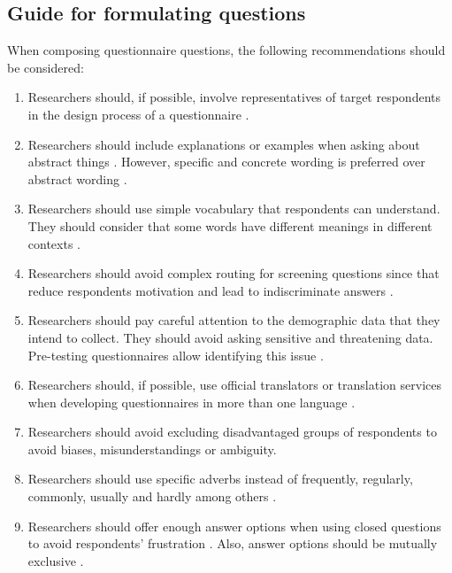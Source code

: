 \subsection{Guide for formulating questions}
\label{sec:questions_guide}
When composing questionnaire questions, the following recommendations should be considered:

\begin{enumerate}
    \item Researchers should, if possible, involve representatives of target respondents in the design process of a questionnaire \cite{Boynton2004b}.
    
    \item Researchers should include explanations or examples when asking about abstract things \cite{Boynton2004b,Crawford1997}. However, specific and concrete wording is preferred over abstract wording \cite{Krosnick2009}.
    
    \item Researchers should use simple vocabulary that respondents can understand. They should consider that some words have different meanings in different contexts \cite{Boynton2004b,Diem,Krosnick2009}.
    
    \item Researchers should avoid complex routing for screening questions since that reduce respondents motivation and lead to indiscriminate answers \cite{Boynton2004b}.
    
    \item Researchers should pay careful attention to the demographic data that they intend to collect. They should avoid asking sensitive and threatening data. Pre-testing questionnaires allow identifying this issue \cite{Boynton2004b}.
    
    \item Researchers should, if possible, use official translators or translation services when developing questionnaires in more than one language \cite{Boynton2004b}.
    
    \item Researchers should avoid excluding disadvantaged groups of respondents to avoid biases, misunderstandings or ambiguity\cite{Boynton2004b}.
    
    \item Researchers should use specific adverbs instead of frequently, regularly, commonly, usually and hardly among others \cite{Boynton2004c,Krosnick2009}.
    
    \item Researchers should offer enough answer options when using closed questions to avoid respondents' frustration \cite{Boynton2004c}. Also, answer options should be mutually exclusive \cite{Krosnick2009}.
    

\end{enumerate}
